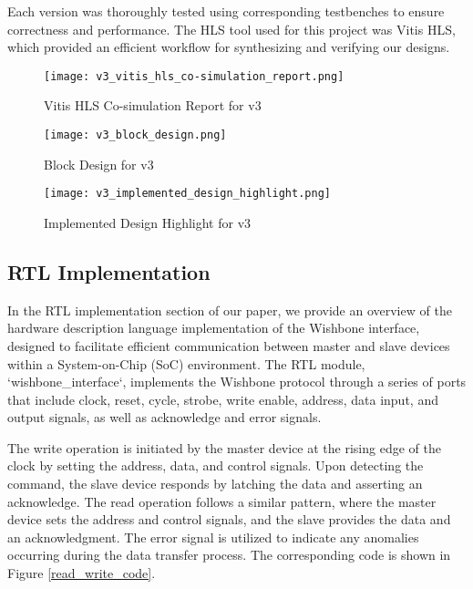 \documentclass[conference]{IEEEtran}
\begin{document}
Each version was thoroughly tested using corresponding testbenches to ensure correctness and performance. The HLS tool used for this project was Vitis HLS, which provided an efficient workflow for synthesizing and verifying our designs.


\begin{figure}[htbp]
    \centering
    \texttt{[image: v3\_vitis\_hls\_co-simulation\_report.png]}
    \caption{Vitis HLS Co-simulation Report for v3}
    \label{fig:v3_vitis_hls_co-simulation_report}
\end{figure}

\begin{figure}[htbp]
    \centering
    \texttt{[image: v3\_block\_design.png]}
    \caption{Block Design for v3}
    \label{fig:v3_block_design}
\end{figure}

\begin{figure}[htbp]
    \centering
    \texttt{[image: v3\_implemented\_design\_highlight.png]}
    \caption{Implemented Design Highlight for v3}
    \label{fig:v3_implemented_design_highlight}
\end{figure}

\subsection{RTL Implementation}
In the RTL implementation section of our paper, we provide an overview of the hardware description language implementation of the Wishbone interface, designed to facilitate efficient communication between master and slave devices within a System-on-Chip (SoC) environment. The RTL module, `wishbone\_interface`, implements the Wishbone protocol through a series of ports that include clock, reset, cycle, strobe, write enable, address, data input, and output signals, as well as acknowledge and error signals.

The write operation is initiated by the master device at the rising edge of the clock by setting the address, data, and control signals. Upon detecting the command, the slave device responds by latching the data and asserting an acknowledge. The read operation follows a similar pattern, where the master device sets the address and control signals, and the slave provides the data and an acknowledgment. The error signal is utilized to indicate any anomalies occurring during the data transfer process. The corresponding code is shown in Figure \ref{read_write_code}.
\end{document}
